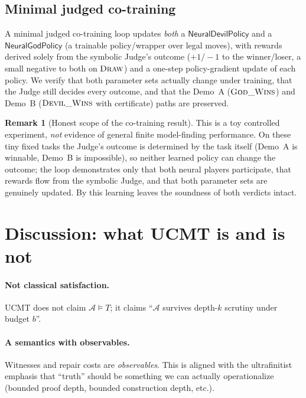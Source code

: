 \documentclass[11pt]{article}
\theoremstyle{definition}
\newtheorem{remark}{Remark}[section]
\theoremstyle{plain}
\newcommand{\Thy}{T}
\newcommand{\Struct}{\mathcal{A}}
\begin{document}
\subsection{Minimal judged co-training}

A minimal judged co-training loop updates \emph{both} a $\mathsf{NeuralDevilPolicy}$ and a
$\mathsf{NeuralGodPolicy}$ (a trainable policy/wrapper over legal moves), with rewards derived
solely from the symbolic Judge's outcome ($+1/-1$ to the winner/loser, a small negative to both
on $\textsc{Draw}$) and a one-step policy-gradient update of each policy. We verify that both
parameter sets actually change under training, that the Judge still decides every outcome, and
that the Demo~A ($\textsc{God\_Wins}$) and Demo~B ($\textsc{Devil\_Wins}$ with certificate) paths
are preserved.

\begin{remark}[Honest scope of the co-training result]
This is a toy controlled experiment, \emph{not} evidence of general finite model-finding
performance. On these tiny fixed tasks the Judge's outcome is determined by the task itself
(Demo~A is winnable, Demo~B is impossible), so neither learned policy can change the outcome;
the loop demonstrates only that both neural players participate, that rewards flow from the
symbolic Judge, and that both parameter sets are genuinely updated. By 
this learning leaves the soundness of both verdicts intact.
\end{remark}

\section{Discussion: what UCMT is and is not}

\paragraph{Not classical satisfaction.}
UCMT does not claim $\Struct\models \Thy$; it claims ``$\Struct$ survives depth-$k$ scrutiny under budget $b$''.

\paragraph{A semantics with observables.}
Witnesses and repair costs are \emph{observables}. This is aligned with the ultrafinitist emphasis that
``truth'' should be something we can actually operationalize (bounded proof depth, bounded construction depth, etc.).
\end{document}

